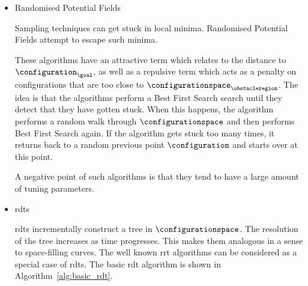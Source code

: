 \begin{itemize}




					\item Randomised Potential Fields

						Sampling techniques can get stuck in local minima.
						Randomised Potential Fields attempt to escape such
						minima.

						These algorithms have an attractive term which relates
						to the distance to $\configuration_{\goal}$, as well as
						a repulsive term which acts as a penalty on
						configurations that are too close to
						$\configurationspace_{\obstacleregion}$. The idea is
						that the algorithms perform a Best First Search search
						until they detect that they have gotten stuck. When this
						happens, the algorithm performs a random walk through
						$\configurationspace$ and  then performs Best First
						Search again. If the algorithm gets stuck too many
						times, it returns back to a random previous point
						$\configuration$ and starts over at this point.

						A negative point of such algorithms is that they tend to
						have a large amount of tuning parameters.

					\item \glspl{rdt}

						\glspl{rdt} incrementally construct a tree in
						$\configurationspace$. The resolution of the tree
						increases as time progresses. This makes them analogous
						in a sense to space-filling curves. The well known
						\gls{rrt} algorithms can be considered as a special case
						of \glspl{rdt}. The basic \gls{rdt} algorithm is shown
						in Algorithm~\ref{alg:basic_rdt}.


\end{itemize}
